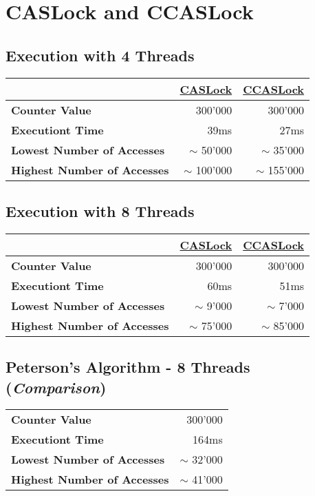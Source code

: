 \documentclass{article}
\begin{document}
	\pagestyle{fancy}
	\section{CASLock and CCASLock}
	\begin{adjustwidth}{2em}{2em}
		\subsection{Execution with 4 Threads}
		\begin{adjustwidth}{2em}{2em}
			\begin{tabular}{|l|r|r|}
				\hline
				& \underline{\textbf{CASLock}} & \underline{\textbf{CCASLock}} \\
				\hline
				\textbf{Counter Value} & 300'000 & 300'000 \\
				\textbf{Executiont Time} & 39ms & 27ms \\
				\textbf{Lowest Number of Accesses} & $\sim$ 50'000 & $\sim$ 35'000 \\
				\textbf{Highest Number of Accesses} & $\sim$ 100'000 & $\sim$ 155'000 \\
				\hline
			\end{tabular}
		\end{adjustwidth}
		\subsection{Execution with 8 Threads}
		\begin{adjustwidth}{2em}{2em}
			\begin{tabular}{|l|r|r|}
				\hline
				& \underline{\textbf{CASLock}} & \underline{\textbf{CCASLock}} \\
				\hline
				\textbf{Counter Value} & 300'000 & 300'000 \\
				\textbf{Executiont Time} & 60ms & 51ms \\
				\textbf{Lowest Number of Accesses} & $\sim$ 9'000 & $\sim$ 7'000 \\
				\textbf{Highest Number of Accesses} & $\sim$ 75'000 & $\sim$ 85'000 \\
				\hline
			\end{tabular}
		\end{adjustwidth}
		\subsection{Peterson's Algorithm - 8 Threads (\textit{Comparison})}
		\begin{adjustwidth}{2em}{2em}
			\begin{tabular}{|l|r|}
				\hline
				\textbf{Counter Value} & 300'000 \\
				\textbf{Executiont Time} & 164ms \\
				\textbf{Lowest Number of Accesses} & $\sim$ 32'000 \\
				\textbf{Highest Number of Accesses} & $\sim$ 41'000 \\
				\hline
			\end{tabular}
		\end{adjustwidth}

\end{adjustwidth}
\end{document}
